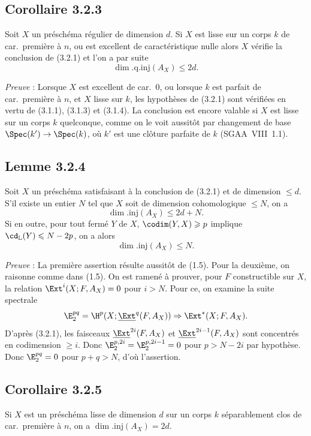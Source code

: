 \subsection*{Corollaire 3.2.3}
Soit $X$ un préschéma régulier de dimension $d$. Si $X$ est lisse sur un corps $k$ de car.~première à $n$, ou est excellent de caractéristique nulle alors $X$ vérifie la conclusion de (3.2.1) et l'on a par suite
\[
\dim.\mathrm{q.inj}(A_X) \leqslant 2d.
\]

\emph{Preuve} : Lorsque $X$ est excellent de car.~0, ou lorsque $k$ est parfait de car.~première à $n$, et $X$ lisse sur $k$, les hypothèses de (3.2.1) sont vérifiées en vertu de (3.1.1), (3.1.3) et (3.1.4). La conclusion est encore valable si $X$ est lisse sur un corps $k$ quelconque, comme on le voit aussitôt par changement de base $\Spec(k') \to \Spec(k)$, où $k'$ est une clôture parfaite de $k$ (SGAA~VIII~1.1).

\subsection*{Lemme 3.2.4}
Soit $X$ un préschéma satisfaisant à la conclusion de (3.2.1) et de dimension $\leqslant d$. S'il existe un entier $N$ tel que $X$ soit de dimension cohomologique $\leqslant N$, on a
\[
\dim.\mathrm{inj}(A_X) \leqslant 2d + N.
\]
Si en outre, pour tout fermé $Y$ de $X$, $\codim(Y,X) \geqslant p$ implique $\cd_{\mathbb{L}}(Y) \leqslant N - 2p$, on a alors
\[
\dim.\mathrm{inj}(A_X) \leqslant N.
\]

\emph{Preuve} : La première assertion résulte aussitôt de (1.5). Pour la deuxième, on raisonne comme dans (1.5). On est ramené à prouver, pour $F$ constructible sur $X$, la relation $\Ext^i(X; F, A_X) = 0$ pour $i > N$. Pour ce, on examine la suite spectrale
\[
\E_2^{pq} = \H^p(X; \underline{\Ext}^q(F, A_X)) \Rightarrow \Ext^{*}(X; F, A_X).
\]
D'après (3.2.1), les
faisceaux $\underline{\Ext}^{2i}(F, A_X)$ et $\underline{\Ext}^{2i-1}(F, A_X)$ sont concentrés en codimension $\geqslant i$. Donc $\E_2^{p,2i} = \E_2^{p,2i-1} = 0$ pour $p > N - 2i$ par hypothèse. Donc $\E_2^{pq} = 0$ pour $p+q > N$, d'où l'assertion.

\subsection*{Corollaire 3.2.5}
Si $X$ est un préschéma lisse de dimension $d$ sur un corps $k$ séparablement clos de car.~première à $n$, on a $\dim.\mathrm{inj}(A_X) = 2d$.


